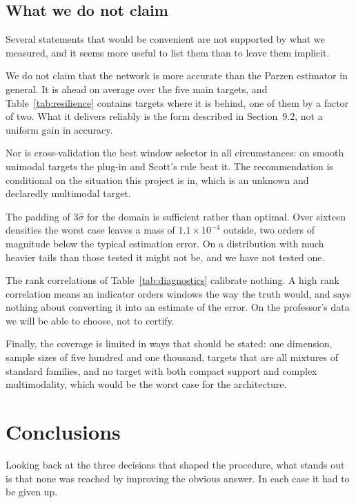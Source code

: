 \documentclass[11pt]{article}
\newcommand{\shat}{\hat{\sigma}}
\begin{document}
\subsection{What we do not claim}

Several statements that would be convenient are not supported by what we measured, and it
seems more useful to list them than to leave them implicit.

We do not claim that the network is more accurate than the Parzen estimator in general. It is
ahead on average over the five main targets, and Table~\ref{tab:resilience} contains targets
where it is behind, one of them by a factor of two. What it delivers reliably is the form
described in Section~9.2, not a uniform gain in accuracy.

Nor is cross-validation the best window selector in all circumstances: on smooth unimodal
targets the plug-in and Scott's rule beat it. The recommendation is
conditional on the situation this project is in, which is an unknown and declaredly
multimodal target.

The padding of $3\shat$ for the domain is sufficient rather than optimal. Over sixteen
densities the worst case leaves a mass of $1.1 \times 10^{-4}$ outside, two orders of
magnitude below the typical estimation error. On a distribution with much heavier tails than
those tested it might not be, and we have not tested one.

The rank correlations of Table~\ref{tab:diagnostics} calibrate nothing. A high rank
correlation means an indicator orders windows the way the truth would, and says nothing about
converting it into an estimate of the error. On the professor's data we will be
able to choose, not to certify.

Finally, the coverage is limited in ways that should be stated: one dimension, sample sizes
of five
hundred and one thousand, targets that are all mixtures of standard families, and no target
with both compact support and complex multimodality, which would be the worst case for the
architecture.

\section{Conclusions}

Looking back at the three decisions that shaped the procedure, what stands out is that none
was reached by improving the obvious answer. In each case it had to be given up.
\end{document}
